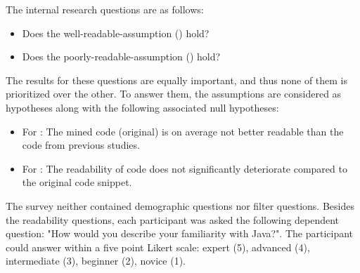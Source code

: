 \documentclass[%
class=scrreprt,
chapterprefix=false,%
open=right,%
twoside=false,%
paper=a4,%
logofile={Logo\_zentral\_farbig\_EN.png},%
thesistype=master,%
UKenglish,%
]{se2thesis}
\theoremstyle{definition}
\begin{document}
	The internal research questions are as follows:
	\begin{itemize}
		\item Does the well-readable-assumption () hold?
		\item Does the poorly-readable-assumption () hold?
	\end{itemize}
	
	The results for these questions are equally important, and thus none of them is prioritized over the other.
	To answer them, the assumptions	are considered as hypotheses along with the following associated null hypotheses:
	\begin{itemize}
		\item For : The mined code (original) is on average not better readable than the code from previous studies.
		\item For : The readability of code does not significantly deteriorate compared to the original code snippet.
	\end{itemize}
	
	The survey neither contained demographic questions nor filter questions. Besides the readability questions, each participant was asked the following dependent question: "How would you describe your familiarity with Java?". The participant could answer within a five point Likert scale: expert (5), advanced (4), intermediate (3), beginner (2), novice (1).
	
\end{document}
